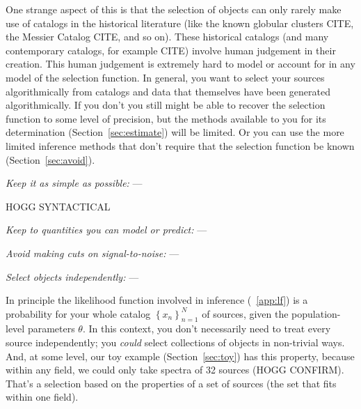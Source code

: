 \documentclass[modern]{aastex62}
\newcommand{\set}[1]{\left\{{#1}\right\}}
\newcommand{\sectionname}{Section}
\renewcommand{\paragraph}[1]{\medskip\noindent\textit{#1} ---}
\begin{document}
One strange aspect of this is that the selection of objects can only
rarely make use of catalogs in the historical literature (like the known
globular clusters CITE, the Messier Catalog CITE, and so on).
These historical catalogs (and many contemporary catalogs, for example CITE)
involve human judgement in their creation.
This human judgement is extremely hard to model or account for in any
model of the selection function.
In general, you want to select your sources algorithmically from
catalogs and data that themselves have been generated algorithmically.
If you don't you still might be able to recover the selection function
to some level of precision, but the methods available to you for its
determination (\sectionname~\ref{sec:estimate}) will be limited.
Or you can use the more limited inference methods that don't require
that the selection function be known (\sectionname~\ref{sec:avoid}).

\paragraph{Keep it as simple as possible:}

HOGG SYNTACTICAL

\paragraph{Keep to quantities you can model or predict:}

\paragraph{Avoid making cuts on signal-to-noise:}

\paragraph{Select objects independently:}

In principle the likelihood function involved in inference
(\appendixname~\ref{app:lf}) is a probability for your whole catalog
$\set{x_n}_{n=1}^N$ of sources, given the population-level parameters
$\theta$.
In this context, you don't necessarily need to treat every source
independently; you \emph{could} select collections of objects in
non-trivial ways.
And, at some level, our toy example (\sectionname~\ref{sec:toy}) has
this property, because within any field, we could only take spectra
of 32 sources (HOGG CONFIRM).
That's a selection based on the properties of a set of sources (the
set that fits within one field).
\end{document}
